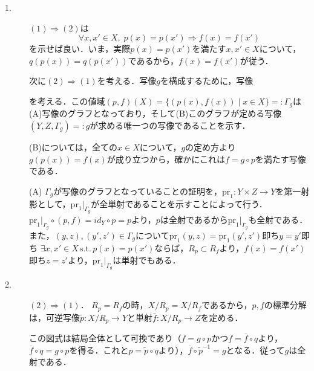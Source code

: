 \documentclass[uplatex,dvipdfmx]{jsreport}
\begin{document}
\begin{Proof}
    \begin{description}
        \item[1. ] $(1)\Rightarrow (2)$は\[ \forall x,x'\in X ,\; p(x)=p(x')\Rightarrow f(x)=f(x') \]を示せば良い．いま，実際$p(x)=p(x')$を満たす$x,x'\in X$について，$q(p(x))=q(p(x'))$であるから，$f(x)=f(x')$が従う．

        次に$(2)\Rightarrow (1)$を考える．写像$g$を構成するために，写像
        \begin{center}\end{center}
        を考える．この値域$(p,f)(X)=\{ (p(x),f(x))\mid x\in X \}=:\Gamma_g$は(A)写像のグラフとなっており，そして(B)このグラフが定める写像$(Y,Z,\Gamma_g)=:g$が求める唯一つの写像であることを示す．
    
        (B)については，全ての$x\in X$について，$g$の定め方より$g(p(x))=f(x)$が成り立つから，確かにこれは$f=g\circ p$を満たす写像である．
    
        (A) $\Gamma_g$が写像のグラフとなっていることの証明を，$\mathrm{pr}_1:Y\times Z\to Y$を第一射影として，$\mathrm{pr}_1|_{\Gamma_g}$が全単射であることを示すことによって行う．
        $\mathrm{pr}_1|_{\Gamma_g}\circ (p,f)=id_Y\circ p=p$より，$p$は全射であるから$\mathrm{pr}_1|_{\Gamma_g}$も全射である．また，$(y,z),(y',z')\in\Gamma_g$について$\mathrm{pr}_1(y,z)=\mathrm{pr}_1(y',z')$即ち$y=y'$即ち
        $\exists x,x'\in X \,\mathrm{s.t.}\, p(x)=p(x')$ならば，$R_p\subset R_f$より，$f(x)=f(x')$即ち$z=z'$より，$\mathrm{pr}_1|_{\Gamma_g}$は単射でもある．
        \item[2. ] $(2)\Rightarrow(1)$． $R_p=R_f$の時，$X/R_p=X/R_f$であるから，$p,f$の標準分解は，可逆写像$\tilde{p}:X/R_p\to Y$と単射$\overline{f}:X/R_p\to Z$を定める．
        \begin{center}\end{center}
        この図式は結局全体として可換であり（$f=g\circ p$かつ$f=\overline{f}\circ q$より，$\overline{f}\circ q=g\circ p$を得る．これと$p=\tilde{p}\circ q$より），$\overline{f}\circ\tilde{p}^{-1}=g$となる．従って$g$は全射である．
    

\end{description}
\end{Proof}
\end{document}
